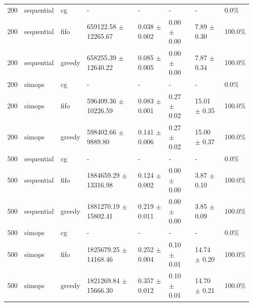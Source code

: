 \begin{tabular}{rlllllll}
200 & sequential & cg & - & - & - & - & 0.0\% \\
200 & sequential & fifo & 659122.58 $\pm$ 12265.67 & 0.038 $\pm$ 0.002 & 0.00 $\pm$ 0.00 & 7.89 $\pm$ 0.30 & 100.0\% \\
200 & sequential & greedy & 658255.39 $\pm$ 12640.22 & 0.085 $\pm$ 0.005 & 0.00 $\pm$ 0.00 & 7.87 $\pm$ 0.34 & 100.0\% \\
200 & simops & cg & - & - & - & - & 0.0\% \\
200 & simops & fifo & 596409.36 $\pm$ 10226.59 & 0.083 $\pm$ 0.001 & 0.27 $\pm$ 0.02 & 15.01 $\pm$ 0.35 & 100.0\% \\
200 & simops & greedy & 598402.66 $\pm$ 9889.80 & 0.141 $\pm$ 0.006 & 0.27 $\pm$ 0.02 & 15.00 $\pm$ 0.37 & 100.0\% \\
500 & sequential & cg & - & - & - & - & 0.0\% \\
500 & sequential & fifo & 1884659.29 $\pm$ 13316.98 & 0.124 $\pm$ 0.002 & 0.00 $\pm$ 0.00 & 3.87 $\pm$ 0.10 & 100.0\% \\
500 & sequential & greedy & 1881270.19 $\pm$ 15802.41 & 0.219 $\pm$ 0.011 & 0.00 $\pm$ 0.00 & 3.85 $\pm$ 0.09 & 100.0\% \\
500 & simops & cg & - & - & - & - & 0.0\% \\
500 & simops & fifo & 1825679.25 $\pm$ 14168.46 & 0.252 $\pm$ 0.004 & 0.10 $\pm$ 0.01 & 14.74 $\pm$ 0.20 & 100.0\% \\
500 & simops & greedy & 1821269.84 $\pm$ 15666.30 & 0.357 $\pm$ 0.012 & 0.10 $\pm$ 0.01 & 14.70 $\pm$ 0.21 & 100.0\% \\
\bottomrule
\end{tabular}
